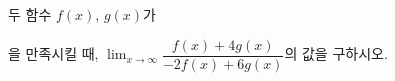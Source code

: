 두 함수 $f(x)$, $g(x)$가 \par\smallskip{}\par\smallskip\noindent 을 만족시킬 때, $\displaystyle\lim_{x\to\infty}\dfrac{f(x)+4g(x)}{-2f(x)+6g(x)}$의 값을 구하시오.
